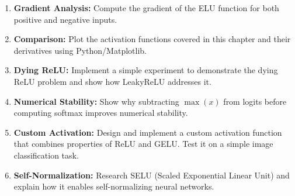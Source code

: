 \begin{enumerate}
    \item \textbf{Gradient Analysis:} Compute the gradient of the ELU function for both positive and negative inputs.
    
    \item \textbf{Comparison:} Plot the activation functions covered in this chapter and their derivatives using Python/Matplotlib.
    
    \item \textbf{Dying ReLU:} Implement a simple experiment to demonstrate the dying ReLU problem and show how LeakyReLU addresses it.
    
    \item \textbf{Numerical Stability:} Show why subtracting $\max(x)$ from logits before computing softmax improves numerical stability.
    
    \item \textbf{Custom Activation:} Design and implement a custom activation function that combines properties of ReLU and GELU. Test it on a simple image classification task.
    
    \item \textbf{Self-Normalization:} Research SELU (Scaled Exponential Linear Unit) and explain how it enables self-normalizing neural networks.
\end{enumerate}
